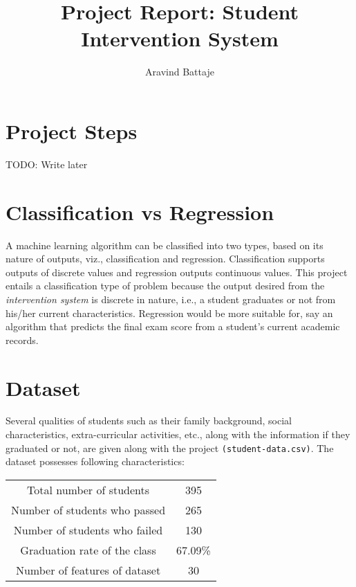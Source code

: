 \documentclass{article}
\begin{document}
	
	\title{Project Report: Student Intervention System}
	\author{Aravind Battaje}
	\maketitle
	\section{Project Steps}
	TODO: Write later
	
	\section{Classification vs Regression}
	A machine learning algorithm can be classified into two types, based on its nature of outputs, viz., classification and regression. Classification supports outputs of discrete values and regression outputs continuous values. This project entails a classification type of problem because the output desired from the \emph{intervention system} is discrete in nature, i.e., a student graduates or not from his/her current characteristics. Regression would be more suitable for, say an algorithm that predicts the final exam score from a student's current academic records.
	
	\section{Dataset}
	Several qualities of students such as their family background, social characteristics, extra-curricular activities, etc., along with the information if they graduated or not, are given along with the project \texttt{(student-data.csv)}. The dataset possesses following characteristics:
	\begin{center}
		\begin{tabular}{c|c}
			\toprule
			Total number of students & 395 \\
			Number of students who passed & 265 \\
			Number of students who failed & 130  \\
			Graduation rate of the class & 67.09\% \\
			Number of features of dataset & 30 \\
			\bottomrule
		\end{tabular}
		\label{tab:data_characteristics}
	\end{center}
	
\end{document}
